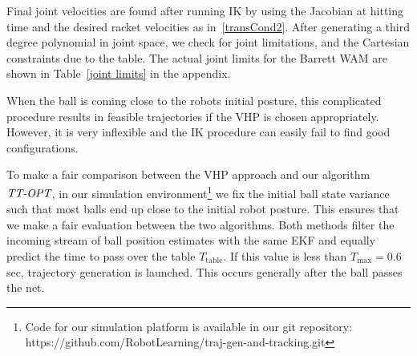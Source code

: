 Final joint velocities are found after running IK by using the Jacobian at hitting time and the desired racket velocities as in~\eqref{transCond2}. After generating a third degree polynomial in joint space, we check for joint limitations, and the Cartesian constraints due to the table. The actual joint limits for the Barrett WAM are shown in Table~\ref{joint limits} in the appendix. 

When the ball is coming close to the robots initial posture, this complicated procedure results in feasible trajectories if the VHP is chosen appropriately. However, it is very inflexible and the IK procedure can easily fail to find good configurations. 

To make a fair comparison between the VHP approach and our algorithm $\emph{TT-OPT}$, in our simulation environment\footnote{Code for our simulation platform is available in our git repository: https://github.com/RobotLearning/traj-gen-and-tracking.git} we fix the initial ball state variance such that most balls end up close to the initial robot posture. This ensures that we make a fair evaluation between the two algorithms. Both methods filter the incoming stream of ball position estimates with the same EKF and equally predict the time to pass over the table $T_{\mathrm{table}}$. If this value is less than $T_{\mathrm{max}} = 0.6$ sec, trajectory generation is launched. This occurs generally after the ball passes the net.

